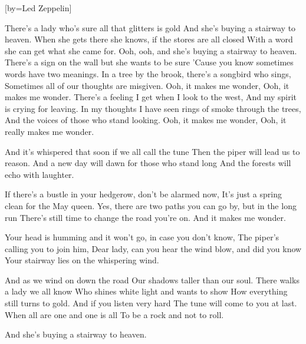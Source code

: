 [by={Led Zeppelin}]

\beginverse
There's a lady who's sure all that glitters is gold
And she's buying a stairway to heaven.
When she gets there she knows, if the stores are all closed
With a word she can get what she came for.
Ooh, ooh, and she's buying a stairway to heaven.
\endverse
\beginverse
There's a sign on the wall but she wants to be sure
'Cause you know sometimes words have two meanings.
In a tree by the brook, there's a songbird who sings,
Sometimes all of our thoughts are misgiven.
\endverse
\beginchorus
Ooh, it makes me wonder,
Ooh, it makes me wonder.
\endchorus
\beginverse
There's a feeling I get when I look to the west,
And my spirit is crying for leaving.
In my thoughts I have seen rings of smoke through the trees,
And the voices of those who stand looking.
\endverse
\beginchorus
Ooh, it makes me wonder,
Ooh, it really makes me wonder.
\endchorus
\beginverse

And it's whispered that soon if we all call the tune
Then the piper will lead us to reason.
And a new day will dawn for those who stand long
And the forests will echo with laughter.
\endverse

\beginverse
If there's a bustle in your hedgerow, don't be alarmed now,
It's just a spring clean for the May queen.
Yes, there are two paths you can go by, but in the long run
There's still time to change the road you're on.
\endverse
\beginchorus
And it makes me wonder.
\endchorus

\beginverse
Your head is humming and it won't go, in case you don't know,
The piper's calling you to join him,
Dear lady, can you hear the wind blow, and did you know
Your stairway lies on the whispering wind.

\endverse

\beginchorus
And as we wind on down the road
Our shadows taller than our soul.
There walks a lady we all know
Who shines white light and wants to show
How everything still turns to gold.
And if you listen very hard
The tune will come to you at last.
When all are one and one is all
To be a rock and not to roll.
\endchorus

And she's buying a stairway to heaven.
\endsong 
